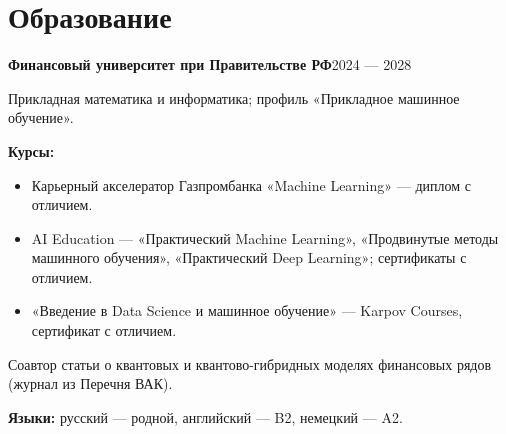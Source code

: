 \documentclass[10pt,a4paper]{article}
\begin{document}
\section{Образование}
\textbf{Финансовый университет при Правительстве РФ}\hfill 2024 — 2028\par
Прикладная математика и информатика; профиль «Прикладное машинное обучение».\par
\textbf{Курсы:}
\begin{itemize}[nosep]
\item Карьерный акселератор Газпромбанка «Machine Learning» — диплом с отличием.
\item AI Education — «Практический Machine Learning», «Продвинутые методы машинного обучения», «Практический Deep Learning»; сертификаты с отличием.
\item «Введение в Data Science и машинное обучение» — Karpov Courses, сертификат с отличием.
\end{itemize}

\vspace{3pt}
Соавтор статьи о квантовых и квантово-гибридных моделях финансовых рядов (журнал из Перечня ВАК).\par
\textbf{Языки:} русский — родной, английский — B2, немецкий — A2.
\end{document}
